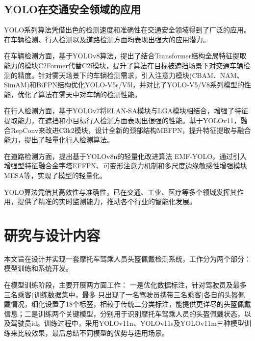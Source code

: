 
\subsection{YOLO在交通安全领域的应用}
YOLO系列算法凭借出色的检测速度和准确性在交通安全领域得到了广泛的应用。在车辆检测、行人检测以及道路检测方面均表现出强大的应用潜力。

在车辆检测方面，\textcite{ex1}基于YOLOv8算法，提出了结合Transformer结构全局特征提取能力的模块C2Former代替C2f模块，提升了算法在目标被遮挡场景下对交通车辆检测的精度。\textcite{ex2}针对雾天场景下的车辆检测需求，引入注意力模块(CBAM、NAM、SimAM)和BiFPN结构优化YOLO-V5s/V5l，并对比了YOLO-V5/V8系列模型的性能，优化了算法在雾天中对车辆的检测性能。

在行人检测方面，\textcite{ex3}基于YOLOv7将ELAN-SA模块与LGA模块相结合，增强了特征提取能力，在遮挡和小目标行人检测方面表现出很强的性能。\textcite{ex4}基于YOLOv11，融合RepConv来改进C3k2模块，设计全新的颈部结构MBFPN，提升特征提取与融合能力，提出了轻量化行人检测算法。

在道路检测方面，\textcite{ex5}提出基于YOLOv8n的轻量化改进算法 EMF-YOLO，通过引入增强型特征融合金字塔EFFPN、可变形注意力机制和多尺度边缘敏感性增强模块MESA等，实现了模型的轻量化。 

YOLO算法凭借其高效性与准确性，已在交通、工业、医疗等多个领域发挥其作用，提供了精准的实时监测能力，推动各个行业的智能化发展。

\section{研究与设计内容}
本文旨在设计并实现一套摩托车驾乘人员头盔佩戴检测系统，工作分为两个部分：模型训练和系统开发。

在模型训练阶段，主要开展两方面工作：
一是优化数据标注，针对驾驶员及最多三名乘客(训练数据集中，最多 只出现了一名驾驶员携带三名乘客)各自的头盔佩戴情况，细化设置了18个标签，相较于传统二分类标注，能提供更详尽的头盔佩戴信息；二是训练两个关键模型，分别用于识别摩托车驾乘人员的头盔佩戴状态，以及驾驶员id。训练过程中，采用YOLOv11n、YOLOv11s及YOLOv11m三种模型训练来比较效果，最后总结不同模型的优势与适用场景。

